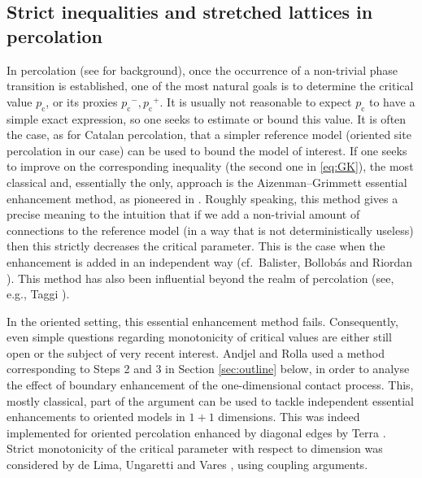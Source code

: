 \documentclass[pdflatex,sn-mathphys-num]{sn-jnl}%
\newcommand{\1}{{\ensuremath{\mathbf{1}}} }
\newcommand{\pc}{\ensuremath{p_{\mathrm{c}} }}
\theoremstyle{thmstyleone}%
\theoremstyle{thmstyletwo}%
\theoremstyle{thmstylethree}%
\begin{document}
\subsection{Strict inequalities and stretched lattices in percolation}
In percolation (see \cite{Grimmett99} for background), once the occurrence of a non-trivial phase transition is established, one of the most natural goals is to determine the critical value $\pc$, or its proxies $\pc^-,\pc^+$. 
It is usually not reasonable to expect $\pc$ to have a simple exact expression, so one seeks to estimate or bound this value. It is often the case, as for Catalan percolation, that a simpler reference model (oriented site percolation in our case) can be used to bound the model of interest. If one seeks to improve on the corresponding inequality (the second one in \eqref{eq:GK}), the most classical and, essentially the only, approach is the Aizenman--Grimmett essential enhancement method, as pioneered in \cite{Aizenman91}. Roughly speaking,  
this method 
gives a precise meaning to the intuition that 
if we add a non-trivial amount of connections to the reference model 
(in a way that is not deterministically useless) 
then this strictly decreases the critical parameter.
This is the case when the enhancement is added in an independent way \cite{Aizenman91} (cf.\ 
Balister, Bollob{\'a}s and Riordan \cite{Balister14}). This method has also been influential beyond the realm of percolation (see, e.g., Taggi \cite{Taggi23}).

In the oriented setting, this essential enhancement method fails. Consequently, even simple questions regarding monotonicity of critical values are either still open or the subject of very recent interest. Andjel and Rolla \cite{Andjel23} used a method corresponding to Steps 2 and 3 in Section \ref{sec:outline} below, in order to analyse the effect of boundary enhancement of the one-dimensional contact process. This, mostly classical, part of the argument can be used to tackle independent essential enhancements to oriented models in $1+1$ dimensions. This was indeed implemented for oriented percolation enhanced by diagonal edges by Terra \cite{Terra25}. Strict monotonicity of the critical parameter with respect to dimension was considered by de Lima, Ungaretti and Vares \cite{DeLima24}, using coupling arguments.
\end{document}
